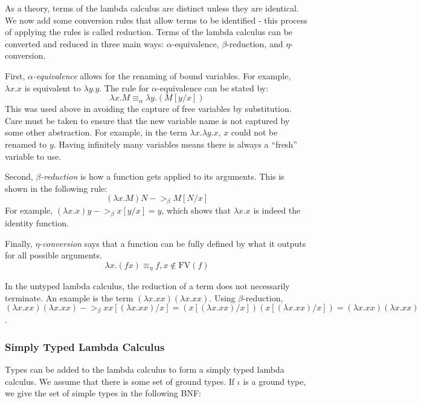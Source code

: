 As a theory, terms of the lambda calculus are distinct unless they are identical.  We now add some conversion rules that allow terms to be identified - this process of applying the rules is called reduction.  Terms of the lambda calculus can be converted and reduced in three main ways:  $\alpha$-equivalence, $\beta$-reduction, and $\eta$-conversion.

First, \emph{$\alpha$-equivalence} allows for the renaming of bound variables.  For example, $\lambda x.x$ is equivalent to $\lambda y.y$.  The rule for $\alpha$-equivalence can be stated by:
\[\lambda x.M \equiv_\alpha \lambda y.(M[y/x])\]
This was used above in avoiding the capture of free variables by substitution.  Care must be taken to ensure that the new variable name is not captured by some other abstraction.  For example, in the term $\lambda x.\lambda y.x$, $x$ could not be renamed to $y$.  Having infinitely many variables means there is always a ``fresh'' variable to use.

Second, \emph{$\beta$-reduction} is how a function gets applied to its arguments.  This is shown in the following rule:
\begin{displaymath}
(\lambda x.M)N ->_{\beta} M[N/x]
\end{displaymath}
For example, $(\lambda x.x)y ->_{\beta} x[y/x] = y$, which shows that $\lambda x.x$ is indeed the identity function.

Finally, \emph{$\eta$-conversion} says that a function can be fully defined by what it outputs for all possible arguments.
\begin{displaymath}
\lambda x.(f x) \equiv_{\eta} f, x\notin \textrm{FV}(f)
\end{displaymath}

In the untyped lambda calculus, the reduction of a term does not necessarily terminate.  An example is the term $(\lambda x.xx)(\lambda x.xx)$.  Using $\beta$-reduction, $(\lambda x.xx)(\lambda x.xx) ->_{\beta} xx[(\lambda x.xx)/x] = (x[(\lambda x.xx)/x])(x[(\lambda x.xx)/x]) = (\lambda x.xx)(\lambda x.xx)$.

\subsubsection{Simply Typed Lambda Calculus}

Types can be added to the lambda calculus to form a simply typed lambda calculus.  We assume that there is some set of ground types.  If $\iota$ is a ground type, we give the set of simple types in the following BNF:

